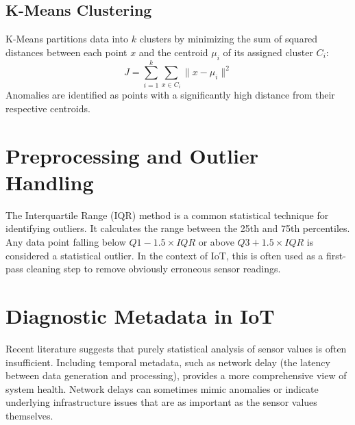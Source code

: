 \subsection{K-Means Clustering}
K-Means \cite{jain2010} partitions data into $k$ clusters by minimizing the sum of squared distances between each point $x$ and the centroid $\mu_i$ of its assigned cluster $C_i$:
\begin{equation}
J = \sum_{i=1}^{k} \sum_{x \in C_i} \|x - \mu_i\|^2
\end{equation}
Anomalies are identified as points with a significantly high distance from their respective centroids.

\section{Preprocessing and Outlier Handling}
The Interquartile Range (IQR) method is a common statistical technique for identifying outliers. It calculates the range between the 25th and 75th percentiles. Any data point falling below $Q1 - 1.5 \times IQR$ or above $Q3 + 1.5 \times IQR$ is considered a statistical outlier. In the context of IoT, this is often used as a first-pass cleaning step to remove obviously erroneous sensor readings.

\section{Diagnostic Metadata in IoT}
Recent literature suggests that purely statistical analysis of sensor values is often insufficient. Including temporal metadata, such as network delay (the latency between data generation and processing), provides a more comprehensive view of system health. Network delays can sometimes mimic anomalies or indicate underlying infrastructure issues that are as important as the sensor values themselves.